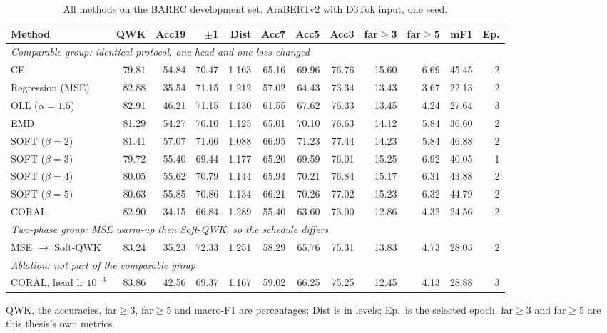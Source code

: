\begin{table}[H]
\centering
\footnotesize
\caption{All methods on the BAREC development set. AraBERTv2 with D3Tok input, one seed.}
\label{tab:res-main-dev}
\begin{adjustbox}{max width=\textwidth}
\begin{tabular}{lrrrrrrrrrrr}
\toprule
\textbf{Method} & \textbf{QWK} & \textbf{Acc19} & \textbf{$\pm$1} & \textbf{Dist} & \textbf{Acc7} & \textbf{Acc5} & \textbf{Acc3} & \textbf{far$\geq$3} & \textbf{far$\geq$5} & \textbf{mF1} & \textbf{Ep.} \\
\midrule
\multicolumn{12}{l}{\textit{Comparable group: identical protocol, one head and one loss changed}} \\
\midrule
CE & 79.81 & 54.84 & 70.47 & 1.163 & 65.16 & 69.96 & 76.76 & 15.60 & 6.69 & 45.45 & 2 \\
Regression (MSE) & 82.88 & 35.54 & 71.15 & 1.212 & 57.02 & 64.43 & 73.34 & 13.43 & 3.67 & 22.13 & 2 \\
OLL ($\alpha=1.5$) & 82.91 & 46.21 & 71.15 & 1.130 & 61.55 & 67.62 & 76.33 & 13.45 & 4.24 & 27.64 & 3 \\
EMD & 81.29 & 54.27 & 70.10 & 1.125 & 65.01 & 70.10 & 76.63 & 14.12 & 5.84 & 36.60 & 2 \\
SOFT ($\beta=2$) & 81.41 & 57.07 & 71.66 & 1.088 & 66.95 & 71.23 & 77.44 & 14.23 & 5.84 & 46.88 & 2 \\
SOFT ($\beta=3$) & 79.72 & 55.40 & 69.44 & 1.177 & 65.20 & 69.59 & 76.01 & 15.25 & 6.92 & 40.05 & 1 \\
SOFT ($\beta=4$) & 80.05 & 55.62 & 70.79 & 1.144 & 65.94 & 70.21 & 76.84 & 15.17 & 6.31 & 43.88 & 2 \\
SOFT ($\beta=5$) & 80.63 & 55.85 & 70.86 & 1.134 & 66.21 & 70.26 & 77.02 & 15.23 & 6.32 & 44.79 & 2 \\
CORAL & 82.90 & 34.15 & 66.84 & 1.289 & 55.40 & 63.60 & 73.00 & 12.86 & 4.32 & 24.56 & 2 \\
\midrule
\multicolumn{12}{l}{\textit{Two-phase group: MSE warm-up then Soft-QWK, so the schedule differs}} \\
\midrule
MSE $\rightarrow$ Soft-QWK & 83.24 & 35.23 & 72.33 & 1.251 & 58.29 & 65.76 & 75.31 & 13.83 & 4.73 & 28.03 & 2 \\
\midrule
\multicolumn{12}{l}{\textit{Ablation: not part of the comparable group}} \\
\midrule
CORAL, head lr $10^{-3}$ & 83.86 & 42.56 & 69.37 & 1.167 & 59.02 & 66.25 & 75.25 & 12.45 & 4.13 & 28.88 & 3 \\
\bottomrule
\end{tabular}
\end{adjustbox}

\vspace{0.1cm}
{\footnotesize QWK, the accuracies, far$\geq$3, far$\geq$5 and macro-F1 are percentages; Dist is in levels; Ep.\ is the selected epoch. far$\geq$3 and far$\geq$5 are this thesis's own metrics.}
\end{table}
